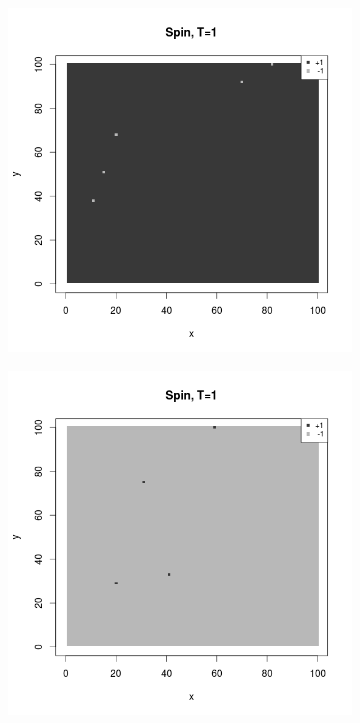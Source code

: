 \documentclass{scrartcl}
\begin{document}
\begin{figure}[ht]
\centering
\begin{subfigure}{.35\textwidth}
  \centering
  \includegraphics[width=1\linewidth]{spins/spinT1+}
\end{subfigure}%
\begin{subfigure}{.35\textwidth}
  \centering
  \includegraphics[width=1\linewidth]{spins/spinT1-}

\end{subfigure}
\end{figure}
\end{document}
